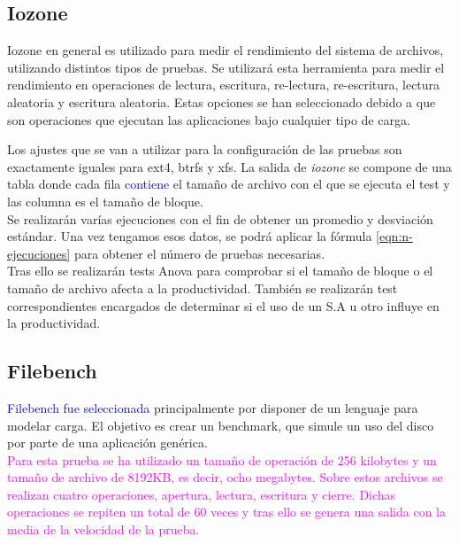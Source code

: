 \subsection{Iozone}\label{metodologia_iozone}
Iozone en general es utilizado para medir el rendimiento del sistema de archivos, utilizando distintos tipos de pruebas. Se utilizará esta herramienta para medir el rendimiento en operaciones de lectura, escritura, re-lectura, re-escritura, lectura aleatoria y escritura aleatoria. Estas opciones se han seleccionado debido a que son operaciones que ejecutan las aplicaciones bajo cualquier tipo de carga.

Los ajustes que se van a utilizar para la configuración de las pruebas son exactamente iguales para ext4, btrfs y xfs. La salida de \textit{iozone} se compone de una tabla donde cada fila \textcolor{blue}{contiene} el tamaño de archivo con el que se ejecuta el test y las columna es el tamaño de bloque. \\

Se realizarán varías ejecuciones con el fin de obtener un promedio y desviación estándar. Una vez tengamos esos datos, se podrá aplicar la fórmula \ref{eqn:n-ejecuciones} para obtener el número de pruebas necesarias.\\

Tras ello se realizarán tests Anova para comprobar si el tamaño de bloque o el tamaño de archivo afecta a la productividad. También se realizarán test correspondientes encargados de determinar si el uso de un S.A u otro influye en la productividad.



\subsection{Filebench}
 \textcolor{blue}{Filebench fue seleccionada} principalmente por disponer de un lenguaje para modelar carga. El objetivo es crear un benchmark, que simule un uso del disco por parte de una aplicación genérica.\\
 
 
 
 \textcolor{magenta}{Para esta prueba se ha utilizado un tamaño de operación de 256 kilobytes y un tamaño de archivo de 8192KB, es decir, ocho megabytes. Sobre estos archivos se realizan cuatro operaciones, apertura, lectura, escritura y cierre. Dichas operaciones se repiten un total de 60 veces y tras ello se genera una salida con la media de la velocidad de la prueba.}

